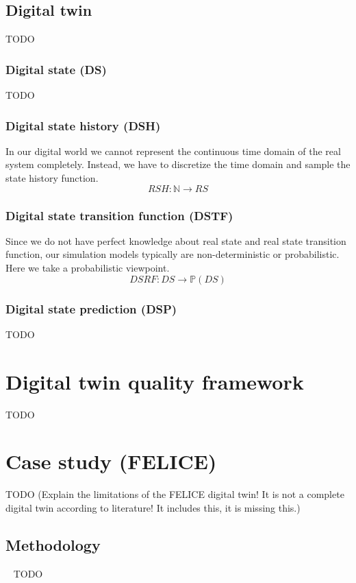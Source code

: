 \documentclass[9pt,conference]{IEEEtran}
\begin{document}
    \subsection{Digital twin}
    TODO

    \subsubsection{Digital state (DS)}
    TODO

    \subsubsection{Digital state history (DSH)}
    In our digital world we cannot represent the continuous time domain of the real system completely.
    Instead, we have to discretize the time domain and sample the state history function.
    \[
        RSH: \mathbb{N} \rightarrow RS
    \]

    \subsubsection{Digital state transition function (DSTF)}
    Since we do not have perfect knowledge about real state and real state transition function, our simulation models typically are non-deterministic or probabilistic.
    Here we take a probabilistic viewpoint.
    \[
        DSRF: DS \rightarrow \mathbb{P}(DS)
    \]

    \subsubsection{Digital state prediction (DSP)}
    TODO

    \section{Digital twin quality framework}
    \label{section:framework_2}
    TODO

    \section{Case study (FELICE)}
    \label{section:case}
    TODO (Explain the limitations of the FELICE digital twin! It is not a complete digital twin according to literature! It includes this, it is missing this.)

    \subsection{Methodology}~\label{section:case_methodology}
    TODO
\end{document}
